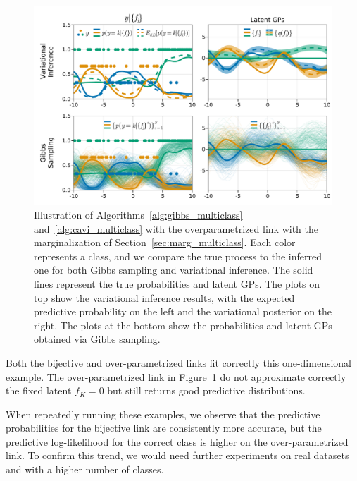 \begin{figure}[H]
    \centering
    \includegraphics[width=\textwidth]{./chapters/8_discussions/figures/categorical_nonbijective.pdf}
    \caption{Illustration of Algorithms~\ref{alg:gibbs_multiclass} and~\ref{alg:cavi_multiclass} with the overparametrized link with the marginalization of Section~\ref{sec:marg_multiclass}.
    Each color represents a class, and we compare the true process to the inferred one for both Gibbs sampling and variational inference.
    The solid lines represent the true probabilities and latent \ac{GPs}.
    The plots on top show the variational inference results, with the expected predictive probability on the left and the variational posterior on the right.
    The plots at the bottom show the probabilities and latent GPs obtained via Gibbs sampling.}
    \label{fig:multiclass}
\end{figure}

Both the bijective and over-parametrized links fit correctly this one-dimensional example.
The over-parametrized link in Figure~\ref{fig:multiclass} do not approximate correctly the fixed latent $f_K=0$ but still returns good predictive distributions.

When repeatedly running these examples, we observe that the predictive probabilities for the bijective link are consistently more accurate, but the predictive log-likelihood for the correct class is higher on the over-parametrized link.
To confirm this trend, we would need further experiments on real datasets and with a higher number of classes. 

